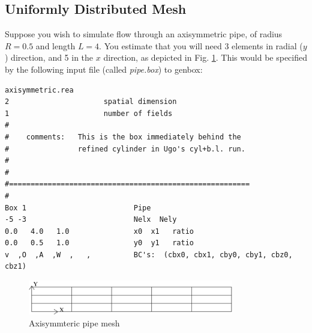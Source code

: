 \subsection{Uniformly Distributed Mesh}

Suppose you wish to simulate flow through an axisymmetric pipe,
of radius $R=0.5$ and length $L=4$.  You estimate that you will
need 3 elements in radial ($y$) direction, and 5 in the $x$ direction,
as depicted in Fig. \ref{fig:mesh_axi1}.
This would be specified by the following input file (called {\em pipe.box})
to genbox:

\begin{verbatim}
axisymmetric.rea
2                      spatial dimension
1                      number of fields
#
#    comments:   This is the box immediately behind the 
#                refined cylinder in Ugo's cyl+b.l. run.
#
#
#========================================================
#
Box 1                         Pipe
-5 -3                         Nelx  Nely
0.0   4.0   1.0               x0  x1   ratio
0.0   0.5   1.0               y0  y1   ratio
v  ,O  ,A  ,W  ,   ,          BC's:  (cbx0, cbx1, cby0, cby1, cbz0, cbz1)
\end{verbatim}
\begin{figure}
\centering
\includegraphics[width=0.8\textwidth]{Figs/mesh_axi1}
\caption{Axisymmteric pipe mesh}
\label{fig:mesh_axi1}
\end{figure}
\noindent
